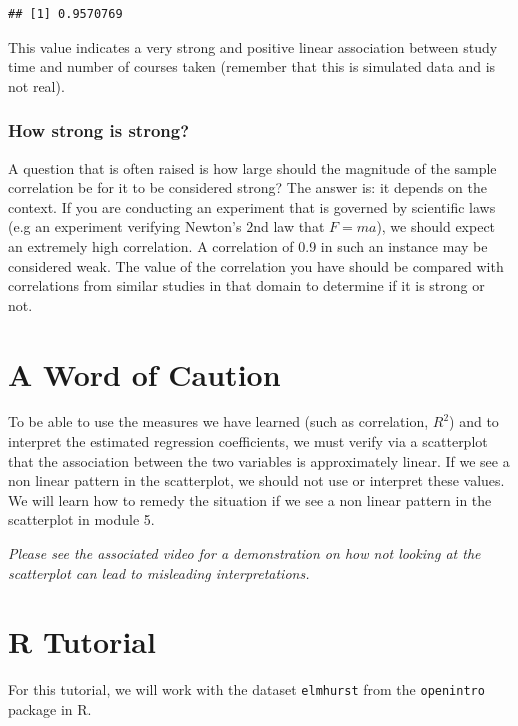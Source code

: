 \documentclass[
]{book}
\begin{document}
\begin{verbatim}
## [1] 0.9570769
\end{verbatim}

This value indicates a very strong and positive linear association between study time and number of courses taken (remember that this is simulated data and is not real).

\hypertarget{how-strong-is-strong}{%
\subsubsection{How strong is strong?}\label{how-strong-is-strong}}

A question that is often raised is how large should the magnitude of the sample correlation be for it to be considered strong? The answer is: it depends on the context. If you are conducting an experiment that is governed by scientific laws (e.g an experiment verifying Newton's 2nd law that \(F = ma\)), we should expect an extremely high correlation. A correlation of 0.9 in such an instance may be considered weak. The value of the correlation you have should be compared with correlations from similar studies in that domain to determine if it is strong or not.

\hypertarget{a-word-of-caution}{%
\section{A Word of Caution}\label{a-word-of-caution}}

To be able to use the measures we have learned (such as correlation, \(R^2\)) and to interpret the estimated regression coefficients, we must verify via a scatterplot that the association between the two variables is approximately linear. If we see a non linear pattern in the scatterplot, we should not use or interpret these values. We will learn how to remedy the situation if we see a non linear pattern in the scatterplot in module 5.

\emph{Please see the associated video for a demonstration on how not looking at the scatterplot can lead to misleading interpretations.}

\hypertarget{r-tutorial}{%
\section{R Tutorial}\label{r-tutorial}}

For this tutorial, we will work with the dataset \texttt{elmhurst} from the \texttt{openintro} package in R.
\end{document}
